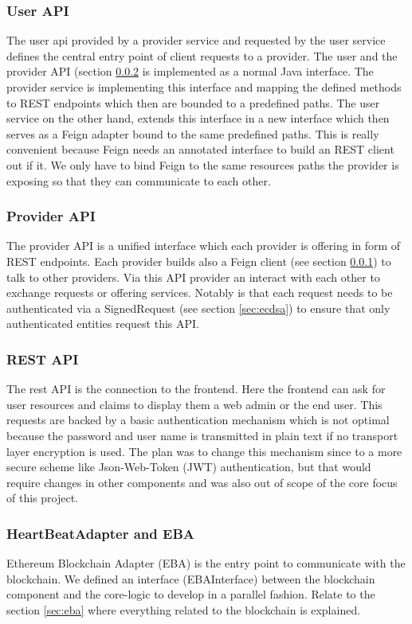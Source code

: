 \subsubsection{User API}
\label{sec:userAPI}
The user api provided by a provider service and requested by the user service defines the central entry point of client requests to a provider. The user and the provider API (section \ref{sec:providerAPI} is implemented as a normal Java interface. The provider service is implementing this interface and mapping the defined methods to REST endpoints which then are bounded to a predefined paths. The user service on the other hand, extends this interface in a new interface which then serves as a Feign adapter bound to the same predefined paths. This is really convenient because Feign needs an annotated interface to build an REST client out if it. We only have to bind Feign to the same resources paths the provider is exposing so that they can communicate to each other. 

\subsubsection{Provider API}
\label{sec:providerAPI}
The provider API is a unified interface which each provider is offering in form of REST endpoints. Each provider builds also a Feign client (see section \ref{sec:userAPI}) to talk to other providers.  Via this API provider an interact with each other to exchange requests or offering services. Notably is that each request needs to be authenticated via a SignedRequest (see section \ref{sec:ecdsa}) to ensure that only authenticated entities request this API. 

\subsubsection{REST API}
The rest API is the connection to the frontend. Here the frontend can ask for user resources and claims to display them a web admin or the end user. This requests are backed by a basic authentication mechanism which is not optimal because the password and user name is transmitted in plain text if no transport layer encryption is used. The plan was to change this mechanism since to a more secure scheme like Json-Web-Token (JWT) authentication, but that would require changes in other components and was also out of scope of the core focus of this project. 

\subsubsection{HeartBeatAdapter and EBA}
Ethereum Blockchain Adapter (EBA) is the entry point to communicate with the blockchain. We defined an interface (EBAInterface) between the blockchain component and the core-logic to develop in a parallel fashion. Relate to the section \ref{sec:eba} where everything related to the blockchain is explained.

